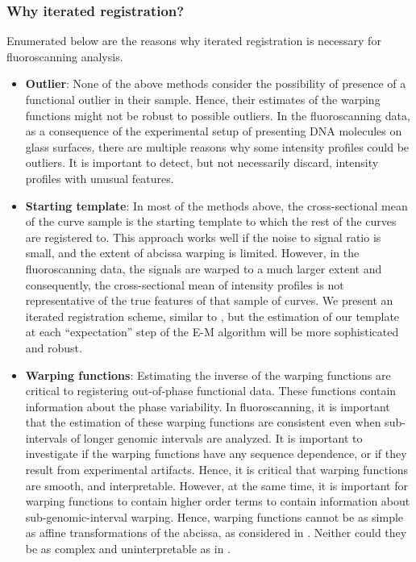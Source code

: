 \subsubsection*{Why iterated registration?}
Enumerated below are the reasons why iterated registration is necessary for fluoroscanning analysis. 
\begin{itemize}
\item {\bf{Outlier}}: None of the above methods consider the possibility of presence of a functional outlier in their sample. Hence, their estimates of the warping functions might not be robust to possible outliers. In the fluoroscanning data, as a consequence of the experimental setup of presenting DNA molecules on glass surfaces, there are multiple reasons why some intensity profiles could be outliers. It is important to detect, but not necessarily discard, intensity profiles with unusual features.

\item {\bf{Starting template}}: In most of the methods above, the cross-sectional mean of the curve sample is the starting template to which the rest of the curves are registered to. This approach works well if the noise to signal ratio is small, and the extent of abcissa warping is limited. However, in the fluoroscanning data, the signals are warped to a much larger extent and consequently, the cross-sectional mean of intensity profiles is not representative of the true features of that sample of curves. We present an iterated registration scheme, similar to \cite{Sangalli_etal_2009_JASA}, but the estimation of our template at each ``expectation'' step of the E-M algorithm will be more sophisticated and robust.

\item {\bf{Warping functions}}: Estimating the inverse of the warping functions are critical to registering out-of-phase functional data. These functions contain information about the phase variability. In fluoroscanning, it is important that the estimation of these warping functions are consistent even when sub-intervals of longer genomic intervals are analyzed. It is important to investigate if the warping functions have any sequence dependence, or if they result from experimental artifacts. Hence, it is critical that warping functions are smooth, and interpretable. However, at the same time, it is important for warping functions to contain higher order terms to contain information about sub-genomic-interval warping. Hence, warping functions cannot be as simple as affine transformations of the abcissa, as considered in \cite{Sangalli_etal_2009_JASA}. Neither could they be as complex and uninterpretable as in \cite{Srivastava_etal_2011_v2_arXiv}. 


\end{itemize}
